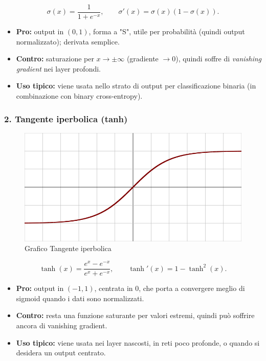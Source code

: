 \documentclass[a4paper,12pt]{report}
\begin{document}
	\[
	\sigma(x) = \frac{1}{1+e^{-x}},\qquad
	\sigma'(x)=\sigma(x)(1-\sigma(x)).
	\]
	\begin{itemize}
		\item \textbf{Pro:} output in \((0,1)\), forma a "S", utile per probabilità (quindi output normalizzato); derivata semplice.
		\item \textbf{Contro:} saturazione per $x\to\pm\infty$ (gradiente $\to0$), quindi soffre di \emph{vanishing gradient} nei layer profondi.
		\item \textbf{Uso tipico:} viene usata nello strato di output per classificazione binaria (in combinazione con binary cross-entropy).
	\end{itemize}
	
	\subsubsection{2. Tangente iperbolica (tanh)}
	
	\begin{figure}[H]
		\centering
		\includegraphics[width=1.0\textwidth]{img/tanh.png}
		\caption{Grafico Tangente iperbolica}
	\end{figure}
	
	\[
	\tanh(x)=\frac{e^x-e^{-x}}{e^x+e^{-x}},\qquad
	\tanh'(x)=1-\tanh^2(x).
	\]
	\begin{itemize}
		\item \textbf{Pro:} output in $(-1,1)$, centrata in $0$, che porta a convergere meglio di sigmoid quando i dati sono normalizzati.
		\item \textbf{Contro:} resta una funzione saturante per valori estremi, quindi può soffrire ancora di vanishing gradient.
		\item \textbf{Uso tipico:} viene usata nei layer nascosti, in reti poco profonde, o quando si desidera un output centrato.
	\end{itemize}
	
\end{document}
